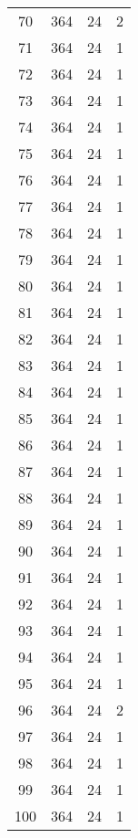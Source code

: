 \begin{longtable}[!]{c|ccc}
	70	& 364	& 24	& 2	\\
	71	& 364	& 24	& 1	\\
	72	& 364	& 24	& 1	\\
	73	& 364	& 24	& 1	\\
	74	& 364	& 24	& 1	\\
	75	& 364	& 24	& 1	\\
	76	& 364	& 24	& 1	\\
	77	& 364	& 24	& 1	\\
	78	& 364	& 24	& 1	\\
	79	& 364	& 24	& 1	\\
	80	& 364	& 24	& 1	\\
	81	& 364	& 24	& 1	\\
	82	& 364	& 24	& 1	\\
	83	& 364	& 24	& 1	\\
	84	& 364	& 24	& 1	\\
	85	& 364	& 24	& 1	\\
	86	& 364	& 24	& 1	\\
	87	& 364	& 24	& 1	\\
	88	& 364	& 24	& 1	\\
	89	& 364	& 24	& 1	\\
	90	& 364	& 24	& 1	\\
	91	& 364	& 24	& 1	\\
	92	& 364	& 24	& 1	\\
	93	& 364	& 24	& 1	\\
	94	& 364	& 24	& 1	\\
	95	& 364	& 24	& 1	\\
	96	& 364	& 24	& 2	\\
	97	& 364	& 24	& 1	\\
	98	& 364	& 24	& 1	\\
	99	& 364	& 24	& 1	\\
	100	& 364	& 24	& 1	\\
\end{longtable}